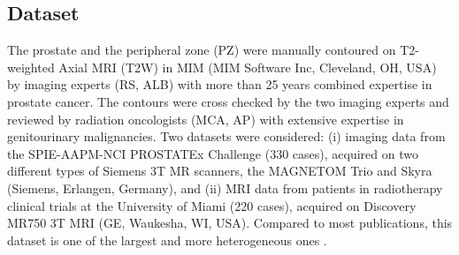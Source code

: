 \subsection{Dataset}
\label{subsec:dataset}
The prostate and the peripheral zone (PZ) were manually contoured on T2-weighted Axial MRI (T2W) in MIM (MIM Software Inc, Cleveland, OH, USA) by imaging experts (RS, ALB) with more than 25 years combined expertise in prostate cancer. The contours were cross checked by the two imaging experts and reviewed by radiation oncologists (MCA, AP) with extensive expertise in genitourinary malignancies. Two datasets were considered: (i) imaging data from the SPIE-AAPM-NCI PROSTATEx Challenge \cite{deukwoo_classification_2018} (330 cases), acquired on two different types of Siemens 3T MR scanners, the MAGNETOM Trio and Skyra (Siemens, Erlangen, Germany), and  (ii) MRI data from patients in radiotherapy clinical trials at the University of Miami (220 cases), acquired on Discovery MR750 3T MRI (GE, Waukesha, WI, USA).  Compared to most publications, this dataset is one of the largest and more heterogeneous ones \cite{anneke,litjens2014evaluation,chowdhury2012concurrent,toth2012multifeature,4_klein2008automatic,5_cheng2014atlas,6_xie2014low,7_tian2015fully,8_korsager2015use,jia20183d}.

